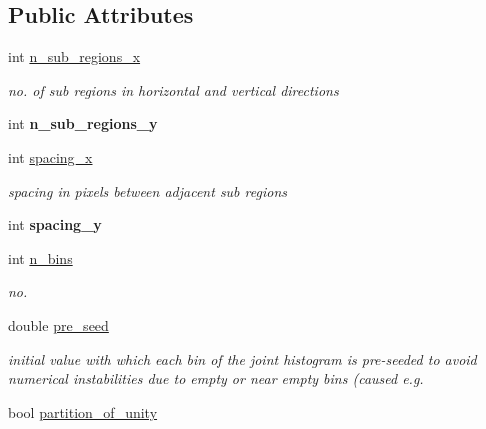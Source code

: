 \subsection*{Public Attributes}
\begin{DoxyCompactItemize}
\item 
\hypertarget{structLKLDParams_a76a8f63d923db7230c450ea6f0eac50c}{int \hyperlink{structLKLDParams_a76a8f63d923db7230c450ea6f0eac50c}{n\-\_\-sub\-\_\-regions\-\_\-x}}\label{structLKLDParams_a76a8f63d923db7230c450ea6f0eac50c}

\begin{DoxyCompactList}\small\item\em no. of sub regions in horizontal and vertical directions \end{DoxyCompactList}\item 
\hypertarget{structLKLDParams_afb619cea42bca043518946eea5ddbbef}{int {\bfseries n\-\_\-sub\-\_\-regions\-\_\-y}}\label{structLKLDParams_afb619cea42bca043518946eea5ddbbef}

\item 
\hypertarget{structLKLDParams_a11ca626cf5b21b432bac85abb3658165}{int \hyperlink{structLKLDParams_a11ca626cf5b21b432bac85abb3658165}{spacing\-\_\-x}}\label{structLKLDParams_a11ca626cf5b21b432bac85abb3658165}

\begin{DoxyCompactList}\small\item\em spacing in pixels between adjacent sub regions \end{DoxyCompactList}\item 
\hypertarget{structLKLDParams_a03e8bb6be07f793d8995916e07e78d36}{int {\bfseries spacing\-\_\-y}}\label{structLKLDParams_a03e8bb6be07f793d8995916e07e78d36}

\item 
int \hyperlink{structLKLDParams_ae8b0eb3d9be40d306935dfeeef2c6077}{n\-\_\-bins}
\begin{DoxyCompactList}\small\item\em no. \end{DoxyCompactList}\item 
double \hyperlink{structLKLDParams_a087e05781a2edef1eced16e97d47a661}{pre\-\_\-seed}
\begin{DoxyCompactList}\small\item\em initial value with which each bin of the joint histogram is pre-\/seeded to avoid numerical instabilities due to empty or near empty bins (caused e.\-g. \end{DoxyCompactList}\item 
\hypertarget{structLKLDParams_a6e6d7201799bbc40eadc2af1e793ac1a}{bool \hyperlink{structLKLDParams_a6e6d7201799bbc40eadc2af1e793ac1a}{partition\-\_\-of\-\_\-unity}}\label{structLKLDParams_a6e6d7201799bbc40eadc2af1e793ac1a}


\end{DoxyCompactItemize}
